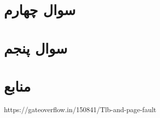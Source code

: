 \documentclass{article}
\begin{document}
\section{سوال چهارم}

\section{سوال پنجم}


\section*{منابع}
\renewcommand{\section}[2]{}%
\begin{thebibliography}{99} %


\begin{LTRitems}

\resetlatinfont

https://gateoverflow.in/150841/Tlb-and-page-fault

\end{LTRitems}

\end{thebibliography}
\end{document}
